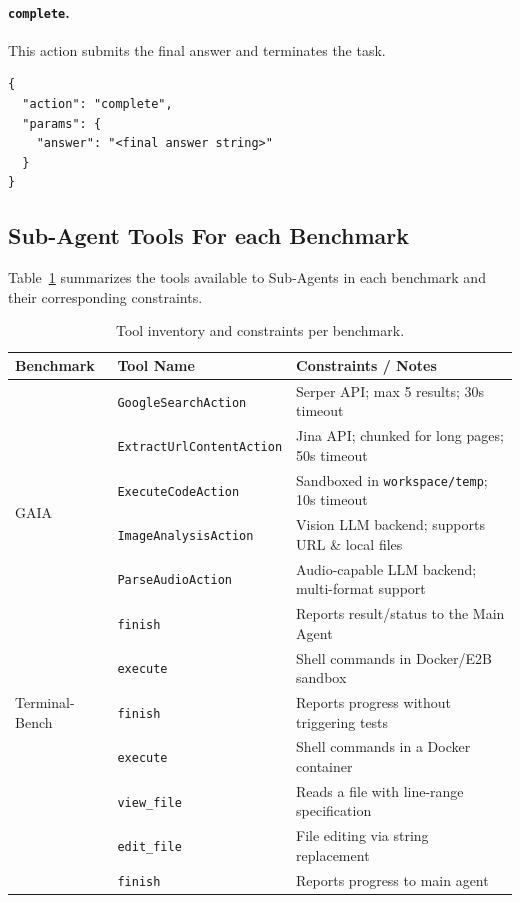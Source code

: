 \paragraph{\texttt{complete}.}
This action submits the final answer and terminates the task.

\begin{tcolorbox}[title={\textbf{\small Action: complete}},
  boxrule=1pt, arc=0mm,
  colback=gray!5,
  colframe=gray!70,
  breakable, before skip=6pt, after skip=10pt,
  pad at break=2mm, parbox=false]
\begin{verbatim}
{
  "action": "complete",
  "params": {
    "answer": "<final answer string>"
  }
}
\end{verbatim}
\end{tcolorbox}

\subsection{Sub-Agent Tools For each Benchmark}
\label{app:tools}
Table~\ref{tab:D_tools} summarizes the tools available to Sub-Agents in each benchmark and their corresponding constraints.

\begin{table}[t]
\centering
\small
\caption{Tool inventory and constraints per benchmark.}
\label{tab:D_tools}
\begin{tabular}{l l p{5.8cm}}
\toprule
\textbf{Benchmark} & \textbf{Tool Name} & \textbf{Constraints / Notes} \\
\midrule
\multirow{6}{*}{GAIA}
  & \texttt{GoogleSearchAction} & Serper API; max 5 results; 30s timeout \\
  & \texttt{ExtractUrlContentAction} & Jina API; chunked for long pages; 50s timeout \\
  & \texttt{ExecuteCodeAction} & Sandboxed in \texttt{workspace/temp}; 10s timeout \\
  & \texttt{ImageAnalysisAction} & Vision LLM backend; supports URL \& local files \\
  & \texttt{ParseAudioAction} & Audio-capable LLM backend; multi-format support \\
  & \texttt{finish} & Reports result/status to the Main Agent \\
\midrule
\multirow{3}{*}{Terminal-Bench}
  & \texttt{execute} & Shell commands in Docker/E2B sandbox \\
  & \texttt{finish} & Reports progress without triggering tests \\

\midrule
\multirow{4}{*}{SWE-Bench}
  & \texttt{execute} & Shell commands in a Docker container \\
  & \texttt{view\_file} & Reads a file with line-range specification \\
  & \texttt{edit\_file} & File editing via string replacement \\
  & \texttt{finish} &  Reports progress to main agent \\
\bottomrule
\end{tabular}
\end{table}

